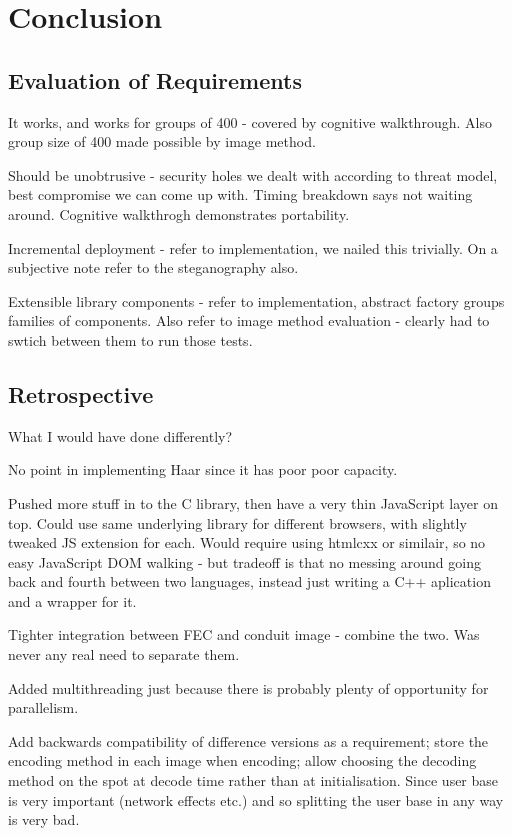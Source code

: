 \chapter{Conclusion}\label{ch:conclusion}

\section{Evaluation of Requirements}

It works, and works for groups of 400 - covered by cognitive walkthrough. Also group size of 400 made possible by image method.

Should be unobtrusive - security holes we dealt with according to threat model, best compromise we can come up with. Timing breakdown says not waiting around. Cognitive walkthrogh demonstrates portability.

Incremental deployment - refer to implementation, we nailed this trivially. On a subjective note refer to the steganography also.

Extensible library components - refer to implementation, abstract factory groups families of components. Also refer to image method evaluation - clearly had to swtich between them to run those tests.

\section{Retrospective}

What I would have done differently?

No point in implementing Haar since it has poor poor capacity.

Pushed more stuff in to the C library, then have a very thin JavaScript layer on top. Could use same underlying library for different browsers, with slightly tweaked JS extension for each. Would require using htmlcxx or similair, so no easy JavaScript DOM walking - but tradeoff is that no messing around going back and fourth between two languages, instead just writing a C++ aplication and a wrapper for it.

Tighter integration between FEC and conduit image - combine the two. Was never any real need to separate them.

Added multithreading just because there is probably plenty of opportunity for parallelism.

Add backwards compatibility of difference versions as a requirement; store the encoding method in each image when encoding; allow choosing the decoding method on the spot at decode time rather than at initialisation. Since user base is very important (network effects etc.) and so splitting the user base in any way is very bad.


